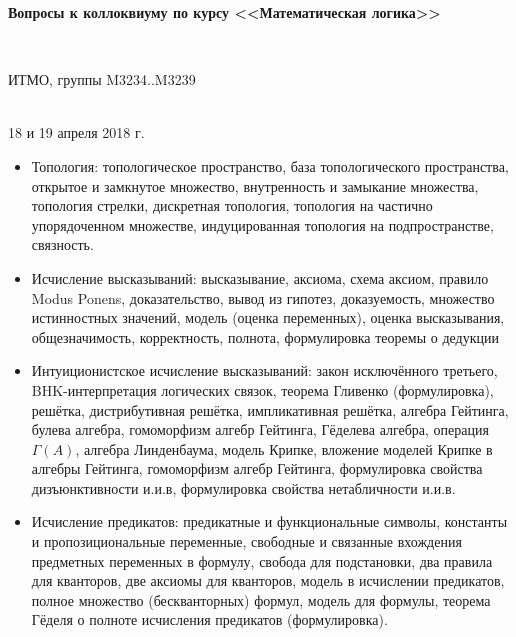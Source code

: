 \documentclass[11pt,a4paper,oneside]{article}
\begin{document}
\begin{center}
\begin{Large}{\bfseries Вопросы к коллоквиуму по курсу <<Математическая логика>>}\end{Large}\\
\vspace{1mm}
\begin{small} ИТМО, группы M3234..M3239\end{small}\\
\small 18 и 19 апреля 2018 г.
\end{center}

\begin{itemize}
\item Топология: топологическое пространство, база топологического пространства, 
открытое и замкнутое множество, внутренность и замыкание множества, топология стрелки,
дискретная топология, топология на частично упорядоченном множестве,
индуцированная топология на подпространстве, связность.
\item Исчисление высказываний: высказывание, аксиома,
схема аксиом, правило Modus Ponens, доказательство,
вывод из гипотез, доказуемость, 
множество истинностных значений, модель (оценка переменных), оценка высказывания, общезначимость, 
корректность, полнота, формулировка теоремы о дедукции
\item Интуиционистское исчисление высказываний: 
закон исключённого третьего, BHK-интерпретация логических связок, теорема Гливенко (формулировка),
решётка, дистрибутивная решётка, импликативная решётка, 
алгебра Гейтинга, булева алгебра, гомоморфизм алгебр Гейтинга,
Гёделева алгебра, операция $\Gamma(A)$, алгебра Линденбаума,
модель Крипке, вложение моделей Крипке в алгебры Гейтинга, гомоморфизм алгебр Гейтинга,
формулировка свойства дизъюнктивности и.и.в, формулировка свойства нетабличности и.и.в.
\item Исчисление предикатов:
предикатные и функциональные символы, константы и пропозициональные переменные,
свободные и связанные вхождения предметных переменных в формулу, 
свобода для подстановки, два правила для кванторов, две аксиомы для кванторов,
модель в исчислении предикатов, полное множество (бескванторных) формул, 
модель для формулы, теорема Гёделя о полноте исчисления предикатов (формулировка).
\end{itemize}
\end{document}
